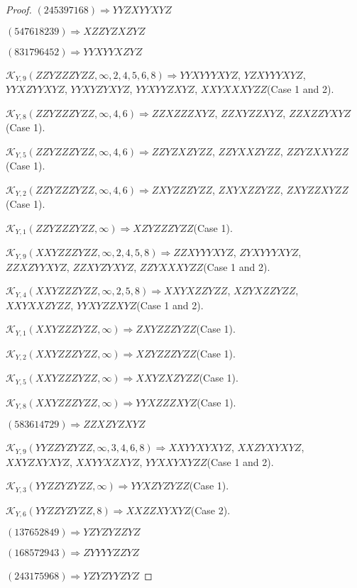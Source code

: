 \documentclass[12pt]{article}
\theoremstyle{plain}
\theoremstyle{definition}
\theoremstyle{remark}
\newcommand{\fancy}[1]{\mathcal{#1}}
\def\K{\fancy{K}}
\begin{document}
\begin{proof}
	
	
	$(2 4 5 3 9 7 1 6 8)\Rightarrow YYZXYYXYZ$
	
	$(5 4 7 6 1 8 2 3 9)\Rightarrow XZZYZXZYZ$
	
	$(8 3 1 7 9 6 4 5 2)\Rightarrow YYXYYXZYZ$
	
	
	
	$\K_{Y,9}(ZZYZZZYZZ,\infty,2, 4, 5, 6, 8)\Rightarrow $$YYXYYYXYZ$, $YZXYYYXYZ$, $YYXZYYXYZ$, $YYXYZYXYZ$, $YYXYYZXYZ$, $XXYXXXYZZ$(Case 1 and 2).
	
	$\K_{Y,8}(ZZYZZZYZZ,\infty,4, 6)\Rightarrow $$ZZXZZZXYZ$, $ZZXYZZXYZ$, $ZZXZZYXYZ$(Case 1).
	
	$\K_{Y,5}(ZZYZZZYZZ,\infty,4, 6)\Rightarrow $$ZZYZXZYZZ$, $ZZYXXZYZZ$, $ZZYZXXYZZ$(Case 1).
	
	$\K_{Y,2}(ZZYZZZYZZ,\infty,4, 6)\Rightarrow $$ZXYZZZYZZ$, $ZXYXZZYZZ$, $ZXYZZXYZZ$(Case 1).
	
	$\K_{Y,1}(ZZYZZZYZZ,\infty)\Rightarrow $$XZYZZZYZZ$(Case 1).
	
	$\K_{Y,9}(XXYZZZYZZ,\infty,2, 4, 5, 8)\Rightarrow $$ZZXYYYXYZ$, $ZYXYYYXYZ$, $ZZXZYYXYZ$, $ZZXYZYXYZ$, $ZZYXXXYZZ$(Case 1 and 2).
	
	$\K_{Y,4}(XXYZZZYZZ,\infty,2, 5, 8)\Rightarrow $$XXYXZZYZZ$, $XZYXZZYZZ$, $XXYXXZYZZ$, $YYXYZZXYZ$(Case 1 and 2).
	
	$\K_{Y,1}(XXYZZZYZZ,\infty)\Rightarrow $$ZXYZZZYZZ$(Case 1).
	
	$\K_{Y,2}(XXYZZZYZZ,\infty)\Rightarrow $$XZYZZZYZZ$(Case 1).
	
	$\K_{Y,5}(XXYZZZYZZ,\infty)\Rightarrow $$XXYZXZYZZ$(Case 1).
	
	$\K_{Y,8}(XXYZZZYZZ,\infty)\Rightarrow $$YYXZZZXYZ$(Case 1).
	
	
	
	$(5 8 3 6 1 4 7 2 9)\Rightarrow ZZXZYZXYZ$
	
	
	
	$\K_{Y,9}(YYZZYZYZZ,\infty,3, 4, 6, 8)\Rightarrow $$XXYYXYXYZ$, $XXZYXYXYZ$, $XXYZXYXYZ$, $XXYYXZXYZ$, $YYXXYXYZZ$(Case 1 and 2).
	
	$\K_{Y,3}(YYZZYZYZZ,\infty)\Rightarrow $$YYXZYZYZZ$(Case 1).
	
	$\K_{Y,6}(YYZZYZYZZ,8)\Rightarrow $$XXZZXYXYZ$(Case 2).
	
	
	
	$(1 3 7 6 5 2 8 4 9)\Rightarrow YZYZYZZYZ$
	
	$(1 6 8 5 7 2 9 4 3)\Rightarrow ZYYYYZZYZ$
	
	$(2 4 3 1 7 5 9 6 8)\Rightarrow YZYZYYZYZ$
	

\end{proof}
\end{document}
